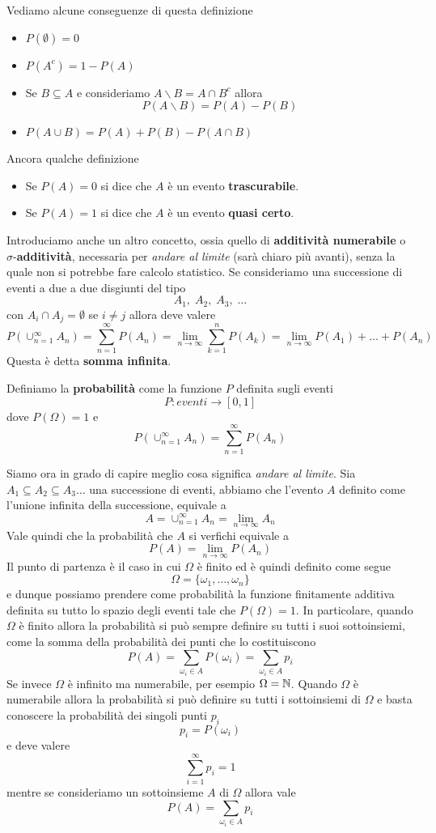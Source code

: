 Vediamo alcune conseguenze di questa definizione
\begin{itemize}
	\item $P(\emptyset) = 0$
	\item $P(A^c) = 1 - P(A)$
	\item Se $B \subseteq A$ e consideriamo $A \backslash B = A \cap B^c$ allora
	      \[ P(A \backslash B) = P(A) - P(B) \]
	\item $P(A \cup B) = P(A) + P(B) - P(A \cap B)$
\end{itemize}
Ancora qualche definizione
\begin{itemize}
	\item Se $P(A) = 0$ si dice che $A$ è un evento \textbf{trascurabile}.
	\item Se $P(A) = 1$ si dice che $A$ è un evento \textbf{quasi certo}.
\end{itemize}
Introduciamo anche un altro concetto, ossia quello di \textbf{additività numerabile} o
$\sigma$-\textbf{additività}, necessaria per \emph{andare al limite} (sarà chiaro più avanti), senza la
quale non si potrebbe fare calcolo statistico. Se consideriamo una successione di eventi a due a due
disgiunti del tipo
\[ A_1, \; A_2, \; A_3, \; \dots \]
con $A_i \cap A_j = \emptyset$ se $i \neq j$ allora deve valere
\[
	P(\cup_{n=1}^\infty A_n) = \sum_{n=1}^\infty P(A_n) =
	\lim_{n \to \infty} \sum_{k=1}^n P(A_k) = 	\lim_{n \to \infty} P(A_1) + \dots + P(A_n)
\]
Questa è detta \textbf{somma infinita}.

\begin{definition}
	Definiamo la \textbf{probabilità} come la funzione $P$ definita sugli eventi
	\[ P : eventi \to [0, 1] \]
	dove $P(\Omega) = 1$ e
	\[ P(\cup_{n=1}^\infty A_n) = \sum_{n=1}^\infty P(A_n) \]
\end{definition}

Siamo ora in grado di capire meglio cosa significa \emph{andare al limite}. Sia
$A_1 \subseteq A_2 \subseteq A_3 \dots$ una successione di eventi, abbiamo che l'evento $A$ definito come
l'unione infinita della successione, equivale a
\[ A = \cup_{n=1}^\infty A_n = \lim_{n \to \infty} A_n \]
Vale quindi che la probabilità che $A$ si verfichi equivale a
\[ P(A) = \lim_{n \to \infty} P(A_n) \]
Il punto di partenza è il caso in cui $\Omega$ è finito ed è quindi definito come segue
\[ \Omega = \{ \omega_1, \dots, \omega_n \} \]
e dunque possiamo prendere come probabilità la funzione finitamente additiva definita su tutto lo spazio
degli eventi tale che $P(\Omega) = 1$. In particolare, quando $\Omega$ è finito allora la probabilità si
può sempre definire su tutti i suoi sottoinsiemi, come la somma della probabilità dei punti che lo
costituiscono
\[ P(A) = \sum_{\omega_i \in A} P(\omega_i) = \sum_{\omega_i \in A} p_i \]
Se invece $\Omega$ è infinito ma numerabile, per esempio $\Omega = \mathbb{N}$. Quando $\Omega$ è numerabile allora
la probabilità si può definire su tutti i sottoinsiemi di $\Omega$ e basta conoscere la probabilità dei
singoli punti $p_i$
\[ p_i = P(\omega_i) \]
e deve valere
\[ \sum_{i=1}^\infty p_i = 1 \]
mentre se consideriamo un sottoinsieme $A$ di $\Omega$ allora vale
\[ P(A) = \sum_{\omega_i \in A} p_i \]
